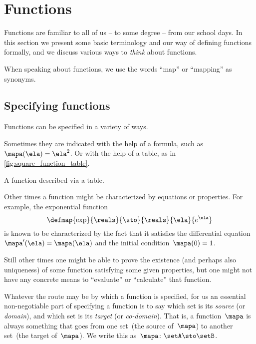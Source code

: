 
\section{Functions}
\label{sec:functions}

Functions are familiar to all of us -- to some degree -- from our school days.
In this section we present some basic terminology and our way of defining functions formally, and we discuss various ways to \emph{think} about functions.

When speaking about functions, we use the words ``map'' or ``mapping'' as synonyms.

\subsection{Specifying functions}
\label{sec:domain-codomain}

Functions can be specified in a variety of ways.

Sometimes they are indicated with the help of a formula, such as~$\mapa(\ela)=\ela^2$.
Or with the help of a table, as in \cref{fig:square_function_table}.

\begin{marginfigure}
    \centering
    \caption{A function described via a table.}
    \label{fig:square_function_table}
\end{marginfigure}

Other times a function might be characterized by equations or properties.
For example, the exponential function
\begin{equation}
    \defmap{\exp}
    {\reals}
    {\sto}
    {\reals}
    {\ela}
    {e^\ela}
\end{equation}
is known to be characterized by the fact that it satisfies the differential equation~$\mapa'(\ela) = \mapa(\ela)$ and the initial condition~$\mapa(0) =1$.

Still other times one might be able to prove the existence (and perhaps also uniqueness) of some function satisfying some given properties, but one might not have any concrete means to ``evaluate'' or ``calculate'' that function.

Whatever the route may be by which a function is specified, for us an essential non-negotiable part of specifying a function is to say which set is its \emph{source} (or \emph{domain}), and which set is its \emph{target} (or \emph{co-domain}).
That is, a function~$\mapa$ is always something that goes from one set~\setA (the source of~$\mapa$) to another set~\setB (the target of~$\mapa$).
We write this as~$\mapa\colon \setA \sto \setB$.


